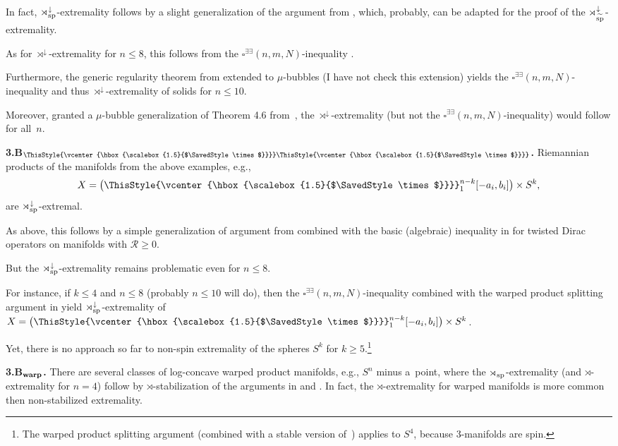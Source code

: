 \documentclass[10pt,a4paper]{amsart}
\numberwithin{equation}{section}
\newcommand\bigtimes{\mathbin{\ThisStyle{\vcenter{\hbox{%
\scalebox{1.5}{$\SavedStyle\times$}}}}}}
\begin{document}
 In fact, $\rtimes^{\downarrow}_{\rm sp}$-extremality follows by a slight generalization of the argument from \cite{WXY2021}, which,
probably, can be adapted for the proof of the
 $\rtimes^{\downarrow}_{\widetilde{\rm sp}}$-extremality.

 As for $\rtimes^{\downarrow}$-extremality for $n\leq 8$, this follows from
 the $\square^{\exists\exists}(n,m,N)$-inequality  \cite[\S2.B]{Gr2023}.

 Furthermore, the generic regularity theorem from \cite{CMS2023} extended to $\mu$-bubbles (I have not check this extension) yields the $\square^{\exists\exists}(n,m,N)$-inequality and thus $\rtimes^{\downarrow}$-extremality of solids for $n\leq10$.

 Moreover, granted
 a $\mu$-bubble generalization of Theorem 4.6 from~\cite{SY2017}, the $\rtimes^{\downarrow}$-extremality (but not the $\square^{\exists\exists}(n,m,N)$-inequality) would follow for all~$n$.

 \textbf{3.B$\boldsymbol{{}_{\bigtimes \bigtimes}}$.}
 Riemannian products of the manifolds from the above examples,
 e.g.,
 \[
 X= \bigl(\bigtimes_1^{n-k}[-a_i,b_i]\bigr)\times S^k,
 \]
  are $\rtimes^{\downarrow}_{\rm sp}$-extremal.

As above, this follows by a simple generalization of argument from \cite{WXY2021}
 combined with the basic (algebraic) inequality in \cite{GS2002} for twisted Dirac operators on manifolds
 with $\mathcal R\geq 0$.

But the $\rtimes^{\downarrow}_{\rm sp}$-extremality remains problematic even for $n\leq 8$.

 For instance, if $k\leq 4$ and $n\leq 8$ (probably $n\leq 10$ will do), then the $\square^{\exists\exists}(n,m,N)$-inequality combined with the warped product splitting argument in \cite[\S5.5]{Gr2021} yield
 $\rtimes^{\downarrow}_{\rm sp}$-extremality of $X= \bigl(\bigtimes_1^{n-k}[-a_i,b_i]\bigr)\times S^k$.

 Yet, there is no approach so far to non-spin extremality of the spheres $S^k$ for $k\geq 5$.\footnote{The warped product splitting argument (combined with a stable version of~\cite{GS2002}) applies to $S^4$, because 3-manifolds are spin.}

 \textbf{3.B$\boldsymbol{{}_{\rm warp}}$.} There are several classes of log-concave
 warped product manifolds,
 e.g., $S^n$ minus a~point, where the $\rtimes_{\rm sp}$-extremality (and $\rtimes$-extremality for $n=4$) follow by
 $\rtimes$-stabilization of the arguments in \cite[\S\S5.5--5.7]{Gr2021} and \cite{CZ2021a}.
  In fact, the $\rtimes$-extremality for warped manifolds is more common then non-stabilized extremality.
\end{document}
